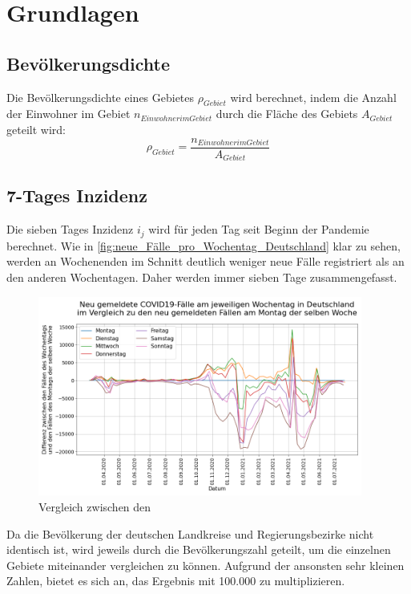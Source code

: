 \chapter{Grundlagen}\label{chap:Grundlagen}
\section{Bevölkerungsdichte}
Die Bevölkerungsdichte eines Gebietes $\rho_{Gebiet}$ wird berechnet, indem die Anzahl der Einwohner im Gebiet $n_{Einwohner im Gebiet}$ durch die Fläche des Gebiets $A_{Gebiet}$ geteilt wird:
\begin{equation}
    \rho_{Gebiet} = \frac{n_{Einwohner im Gebiet}}{A_{Gebiet}}
\end{equation}
\section{7-Tages Inzidenz}\label{sec:Datenaufbereitung}
Die sieben Tages Inzidenz $i_j$ wird für jeden Tag seit Beginn der Pandemie berechnet.
Wie in \autoref{fig:neue_Fälle_pro_Wochentag_Deutschland} klar zu sehen, werden an Wochenenden im Schnitt deutlich weniger neue Fälle registriert als an den anderen Wochentagen.
Daher werden immer sieben Tage zusammengefasst.
\begin{figure}[H]
    \centering
    \includegraphics[width=0.95\textwidth]{figures/neue_Fälle_pro_Wochentag_Deutschland.png}
    \caption{Vergleich zwischen den }
    \label{fig:neue_Fälle_pro_Wochentag_Deutschland}
\end{figure}
Da die Bevölkerung der deutschen Landkreise und Regierungsbezirke nicht identisch ist, wird jeweils durch die Bevölkerungszahl geteilt, um die einzelnen Gebiete miteinander vergleichen zu können. Aufgrund der ansonsten sehr kleinen Zahlen, bietet es sich an, das Ergebnis mit 100.000 zu multiplizieren.

